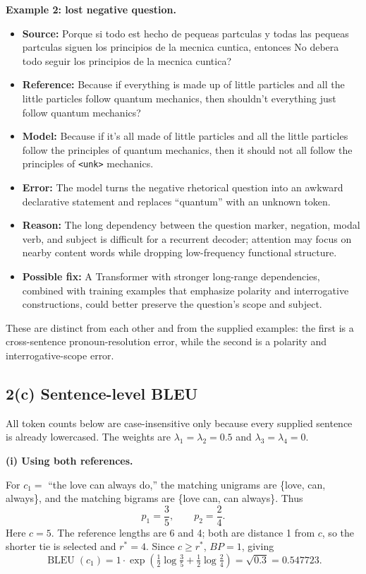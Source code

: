 \documentclass[10pt]{article}
\begin{document}
\textbf{Example 2: lost negative question.}

\begin{itemize}
  \item \textbf{Source:} Porque si todo est hecho de pequeas partculas y todas las pequeas partculas siguen los principios de la mecnica cuntica, entonces No debera todo seguir los principios de la mecnica cuntica?
  \item \textbf{Reference:} Because if everything is made up of little particles and all the little particles follow quantum mechanics, then shouldn't everything just follow quantum mechanics?
  \item \textbf{Model:} Because if it's all made of little particles and all the little particles follow the principles of quantum mechanics, then it should not all follow the principles of \texttt{<unk>} mechanics.
  \item \textbf{Error:} The model turns the negative rhetorical question into an awkward declarative statement and replaces ``quantum'' with an unknown token.
  \item \textbf{Reason:} The long dependency between the question marker, negation, modal verb, and subject is difficult for a recurrent decoder; attention may focus on nearby content words while dropping low-frequency functional structure.
  \item \textbf{Possible fix:} A Transformer with stronger long-range dependencies, combined with training examples that emphasize polarity and interrogative constructions, could better preserve the question's scope and subject.
\end{itemize}

These are distinct from each other and from the supplied examples: the first is a cross-sentence pronoun-resolution error, while the second is a polarity and interrogative-scope error.

\subsection*{2(c) Sentence-level BLEU}

All token counts below are case-insensitive only because every supplied sentence is already lowercased. The weights are $\lambda_1=\lambda_2=0.5$ and $\lambda_3=\lambda_4=0$.

\textbf{(i) Using both references.}

For $c_1=$ ``the love can always do,'' the matching unigrams are \{love, can, always\}, and the matching bigrams are \{love can, can always\}. Thus
\[
p_1=\frac{3}{5},\qquad p_2=\frac{2}{4}.
\]
Here $c=5$. The reference lengths are 6 and 4; both are distance 1 from $c$, so the shorter tie is selected and $r^*=4$. Since $c\ge r^*$, $BP=1$, giving
\[
\operatorname{BLEU}(c_1)=1\cdot\exp\left(\tfrac12\log\tfrac35+\tfrac12\log\tfrac24\right)
=\sqrt{0.3}=0.547723.
\]
\end{document}
